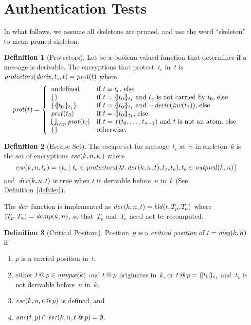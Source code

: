 \documentclass[12pt]{article}
\theoremstyle{definition}
\newtheorem{defn}{Definition}[section]
\begin{document}
\section{Authentication Tests}\label{sec:auth tests}

In what follows, we assume all skeletons are pruned, and use the word
``skeleton'' to mean pruned skeleton.

\begin{defn}[Protectors]
Let  be a boolean valued function that determines if a
message is derivable.  The encryptions that protect~$t_c$ in~$t$ is
$\operatorname{\mathit{protectors}}(\operatorname{\mathit{deriv}},t_c, t) = \operatorname{\mathit{prot}}(t)$ where
$$\fn{prot}(t) =\left\{
\begin{array}{ll}
\mbox{undefined}&\mbox{if $t\equiv t_c$, else}\\
\{\}&\mbox{if $t=\enc{t_0}{t_1}$ and $t_c$ is not carried by~$t_0$, else}\\
\{\enc{t_0}{t_1}\}&
\mbox{if $t=\enc{t_0}{t_1}$ and $\lnot\fn{deriv}(\fn{inv}(t_1))$, else}\\
\fn{prot}(t_0)&\mbox{if $t=\enc{t_0}{t_1}$, else}\\
\bigcup_{i<n}\fn{prot}(t_i)&\mbox{if $t=f(t_0,\ldots,t_{n-1})$ and~$t$
  is not an atom, else}\\
\{\}&\mbox{otherwise.}
\end{array}\right.$$
\end{defn}

\begin{defn}[Escape Set]
The escape set for message~$t_c$ at~$n$ in skeleton~$k$ is the set of
encryptions $\operatorname{\mathit{esc}}(k,n,t_c)$ where
$$\operatorname{\mathit{esc}}(k,n,t_c)=\{t_e\mid t_e\in\operatorname{\mathit{protectors}}(\lambda
t\mathpunct.\operatorname{\mathit{der}}(k,n,t),t_c,t_o), t_o\in\operatorname{\mathit{outpred}}(k,n)\}$$
and~$\operatorname{\mathit{der}}(k,n,t)$ is true when $t$ is derivable before~$n$ in~$k$
(See Definition~\ref{def:der}).
\end{defn}

The $\operatorname{\mathit{der}}$ function is implemented as
$\operatorname{\mathit{der}}(k,n,t)=\operatorname{\mathit{bld}}(t,T_p,T_a)$ where
$(T_p,T_a)=\operatorname{\mathit{dcmp}}(k,n)$, so that~$T_p$ and~$T_a$ need not be
recomputed.

\begin{defn}[Critical Position]
Position~$p$ is a \emph{critical position} of $t=\operatorname{\mathit{msg}}(k,n)$ if
\begin{enumerate}
\item $p$ is a carried position in~$t$,
\item either $t\mathbin{@} p\in\operatorname{\mathit{unique}}(k)$ and $t\mathbin{@} p$ originates
  in~$k$, or $t\mathbin{@} p=\{\!|t_0|\!\}_{t_1}$ and~$t_1$ is not derivable
  before~$n$ in~$k$,
\item $\operatorname{\mathit{esc}}(k,n,t\mathbin{@} p)$ is defined, and
\item $\operatorname{\mathit{anc}}(t,p)\cap \operatorname{\mathit{esc}}(k,n,t\mathbin{@} p)=\emptyset$.
\end{enumerate}
\end{defn}
\end{document}
